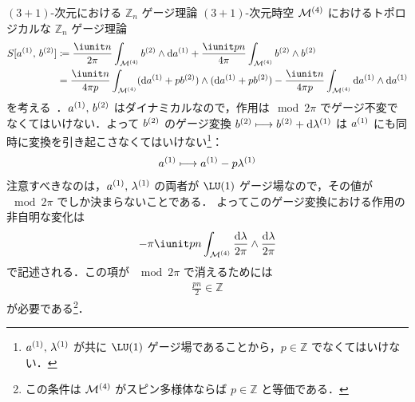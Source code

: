 \documentclass[TQFT_main]{subfiles}
\begin{document}
\begin{myexample}[label=ex:BF-4D]{$(3+1)$-次元における $\mathbb{Z}_n$ ゲージ理論}
    $(3+1)$-次元時空 $\mathcal{M}^{(4)}$ におけるトポロジカルな $\mathbb{Z}_n$ ゲージ理論
    \begin{align}
        \label{eq:BF-4D-1}
        S [\hg{a}{1},\, \hg{b}{2}] 
        &\coloneqq \frac{\iunit n}{2\pi} \int_{\mfdcal{M}{4}} \hg{b}{2} \wedge \dd{\hg{a}{1}} + \frac{\iunit  pn}{4\pi} \int_{\mfdcal{M}{4}} \hg{b}{2} \wedge \hg{b}{2} \\
        &= \frac{\iunit n}{4\pi p} \int_{\mfdcal{M}{4}} (\dd{\hg{a}{1}} + p \hg{b}{2}) \wedge (\dd{\hg{a}{1}} + p \hg{b}{2}) - \frac{\iunit n}{4\pi p} \int_{\mfdcal{M}{4}} \dd{\hg{a}{1}} \wedge \dd{\hg{a}{1}} \label{eq:discrete-theta}
    \end{align}
    を考える~\cite[p.21]{KapustinSeiberg2014}．$a^{(1)},\, b^{(2)}$ はダイナミカルなので，作用は$\mod 2\pi$ でゲージ不変でなくてはいけない．よって $b^{(2)}$ のゲージ変換 $b^{(2)} \longmapsto b^{(2)} + \dd{\lambda^{(1)}}$ は $a^{(1)}$ にも同時に変換を引き起こさなくてはいけない\footnote{$a^{(1)},\, \lambda^{(1)}$ が共に $\LU (1)$ ゲージ場であることから，$p \in \mathbb{Z}$ でなくてはいけない．}：
    \begin{align}
        a^{(1)} \longmapsto a^{(1)} - p \lambda^{(1)}
    \end{align}
    注意すべきなのは，$a^{(1)},\, \lambda^{(1)}$ の両者が $\LU(1)$ ゲージ場なので，その値が $\mod 2\pi$ でしか決まらないことである．
    よってこのゲージ変換における作用の非自明な変化は
    \begin{align}
        - \pi \iunit pn \int_{\mfdcal{M}{4}} \frac{\dd{\lambda}}{2\pi} \wedge \frac{\dd{\lambda}}{2\pi}
    \end{align}
    で記述される．この項が $\mod 2\pi$ で消えるためには
    \begin{align}
        \frac{pn}{2} \in \mathbb{Z}
    \end{align}
    が必要である\footnote{この条件は $\mathcal{M}^{(4)}$ がスピン多様体ならば $p \in \mathbb{Z}$ と等価である．}．
    

\end{myexample}
\end{document}
